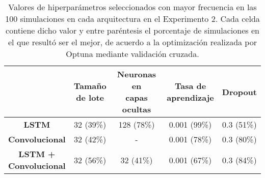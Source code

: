 \documentclass[../../main.tex]{subfiles}
\begin{document}
\begin{table}[ht]
    \centering
    \renewcommand{\arraystretch}{1.2}
    \begin{tabular}{|c|c|c|c|c|}
        \hline
            & \makecell{\textbf{Tamaño}\\\textbf{de lote}}
            & \makecell{\textbf{Neuronas en}\\\textbf{capas ocultas}}
            & \makecell{\textbf{Tasa de}\\\textbf{aprendizaje}}
            & \textbf{Dropout} \\ \hline\hline
        \textbf{LSTM}
            & 32 (39\%) & 128 (78\%) & 0.001 (99\%) & 0.3 (51\%) \\ \hline
        \textbf{Convolucional}
            & 32 (42\%) & -          & 0.001 (78\%) & 0.3 (80\%) \\ \hline
        \makecell{\textbf{LSTM +}\\\textbf{Convolucional}}
            & 32 (56\%) & 32 (41\%)  & 0.001 (67\%) & 0.3 (84\%) \\
        \hline
    \end{tabular}
    \caption{Valores de hiperparámetros seleccionados con mayor frecuencia en las 100
    simulaciones en cada arquitectura en el Experimento 2. Cada celda contiene dicho valor
    y entre paréntesis el porcentaje de simulaciones en el que resultó ser el mejor, de
    acuerdo a la optimización realizada por Optuna mediante validación cruzada.}
    \label{tab:hyperparams_exp2}
\end{table}
\end{document}
